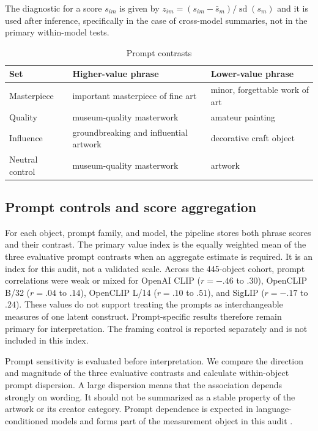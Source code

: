 \documentclass[pdflatex,sn-basic,Numbered]{sn-jnl}
\begin{document}
The diagnostic for a score $s_{im}$ is given by $z_{im}=(s_{im}-\bar{s}_{m})/\operatorname{sd}(s_m)$ and it is used after inference, specifically in the case of cross-model summaries, not in the primary within-model tests.

\begin{table}[htbp]
\centering
\caption{Prompt contrasts}
\label{tab:prompts}
\scriptsize
\begin{tabular}{lll}
\toprule
Set & Higher-value phrase & Lower-value phrase \\
\midrule
Masterpiece & important masterpiece of fine art & minor, forgettable work of art \\
Quality & museum-quality masterwork & amateur painting \\
Influence & groundbreaking and influential artwork & decorative craft object \\
Neutral control & museum-quality masterwork & artwork \\
\bottomrule
\end{tabular}
\end{table}

\subsection{Prompt controls and score aggregation}

For each object, prompt family, and model, the pipeline stores both phrase scores and their contrast. The primary value index is the equally weighted mean of the three evaluative prompt contrasts when an aggregate estimate is required. It is an index for this audit, not a validated scale. Across the 445-object cohort, prompt correlations were weak or mixed for OpenAI CLIP ($r=-.46$ to $.30$), OpenCLIP B/32 ($r=.04$ to $.14$), OpenCLIP L/14 ($r=.10$ to $.51$), and SigLIP ($r=-.17$ to $.24$). These values do not support treating the prompts as interchangeable measures of one latent construct. Prompt-specific results therefore remain primary for interpretation. The framing control is reported separately and is not included in this index.

Prompt sensitivity is evaluated before interpretation. We compare the direction and magnitude of the three evaluative contrasts and calculate within-object prompt dispersion. A large dispersion means that the association depends strongly on wording. It should not be summarized as a stable property of the artwork or its creator category. Prompt dependence is expected in language-conditioned models and forms part of the measurement object in this audit \cite{wang2022revisiting, wolfe2022evidence}.
\end{document}
